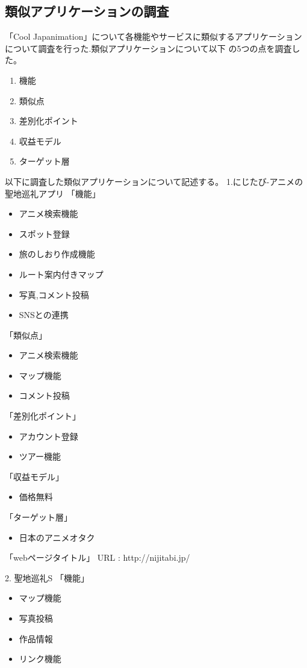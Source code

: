 \subsection{類似アプリケーションの調査}
\par
「Cool Japanimation」について各機能やサービスに類似するアプリケーションについて調査を行った.類似アプリケーションについて以下
の5つの点を調査した。
\begin{enumerate}
\item 機能
\item 類似点
\item 差別化ポイント
\item 収益モデル
\item ターゲット層
\end{enumerate}
\per
以下に調査した類似アプリケーションについて記述する。
\per
1.にじたび-アニメの聖地巡礼アプリ
「機能」
\begin{itemize}
\item アニメ検索機能
\item スポット登録
\item 旅のしおり作成機能
\item ルート案内付きマップ
\item 写真,コメント投稿
\item SNSとの連携
\end{itemize}
「類似点」
\begin{itemize}
\item アニメ検索機能
\item マップ機能
\item コメント投稿
\end{itemize}
「差別化ポイント」
\begin{itemize}
\item アカウント登録
\item ツアー機能
\end{itemize}
「収益モデル」
\begin{itemize}
\item 価格無料
\end{itemize}
「ターゲット層」
\begin{itemize}
\item 日本のアニメオタク
\end{itemize}
「webページタイトル」
URL : http://nijitabi.jp/
\par 
2. 聖地巡礼S
「機能」
\begin{itemize}
\item マップ機能
\item 写真投稿
\item 作品情報
\item リンク機能
\end{itemize}
